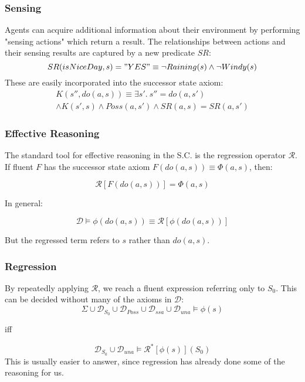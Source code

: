 \documentclass{beamer}
\begin{document}
\begin{frame}
\frametitle{Sensing}
Agents can acquire additional information about their environment by performing
"sensing actions" which return a result.  The relationships between actions
and their sensing results are captured by a new predicate $SR$:
\begin{equation*}
SR(isNiceDay,s) = "YES" \equiv \neg Raining(s) \wedge \neg Windy(s)
\end{equation*}
These are easily incorporated into the successor state axiom:
\begin{multline*}
 K(s'',do(a,s)) \equiv \exists s' . \ s''=do(a,s') \\
 \wedge K(s',s) \wedge Poss(a,s') \wedge SR(a,s) = SR(a,s')
\end{multline*}
\end{frame}

\begin{frame}
\frametitle{Effective Reasoning}
The standard tool for effective reasoning in the S.C. is the
regression operator $\mathcal{R}$. If fluent $F$ has the successor state axiom
$F(do(a,s)) \equiv \Phi(a,s)$, then:

\[ \mathcal{R}[F(do(a,s))] = \Phi(a,s) \]

\pause
In general:

\[  \mathcal{D} \models \phi(do(a,s)) \equiv \mathcal{R}[\phi(do(a,s))] \]

But the regressed term refers to $s$ rather than $do(a,s)$.

\end{frame}

\begin{frame}
\frametitle{Regression}
By repeatedly applying $\mathcal{R}$, we reach a fluent expression referring
only to $S_0$.  This can be decided without many of the axioms in $\mathcal{D}$:
\begin{equation*}
  \Sigma \cup \mathcal{D}_{S_0} \cup \mathcal{D}_{Poss} \cup \mathcal{D}_{ssa} \cup \mathcal{D}_{una} \models \phi(s)
\end{equation*}
\begin{center}
iff
\end{center}
\begin{equation*}
  \mathcal{D}_{S_0} \cup \mathcal{D}_{una} \models \mathcal{R}^{*}[\phi(s)](S_0)
\end{equation*}
This is usually easier to answer, since regression has already done some
of the reasoning for us.
\end{frame}
\end{document}

